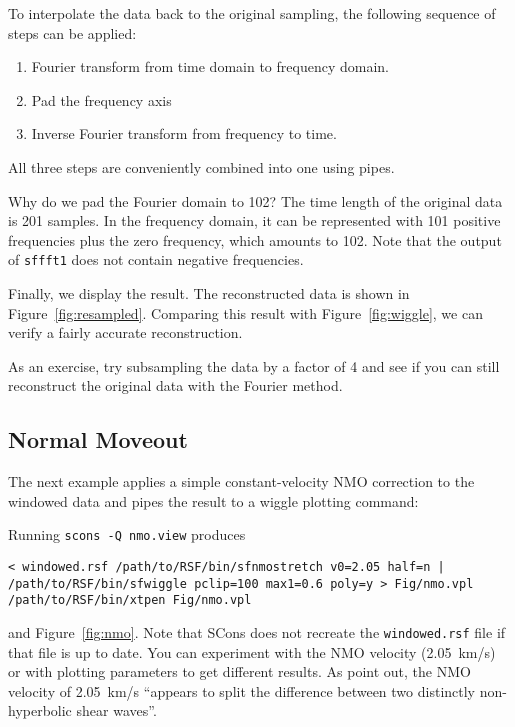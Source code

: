 To interpolate the data back to the original sampling, the following sequence
of steps can be applied:
\begin{enumerate}
\item Fourier transform from time domain to frequency domain.
\item Pad the frequency axis
\item Inverse Fourier transform from frequency to time.
\end{enumerate}
All three steps are conveniently combined into one using pipes.


Why do we pad the Fourier domain to 102? The time length of the original data
is 201 samples. In the frequency domain, it can be represented with 101
positive frequencies plus the zero frequency, which amounts to 102. Note that
the output of \texttt{sffft1} does not contain negative frequencies.

Finally, we display the result. The reconstructed data is shown in
Figure~\ref{fig:resampled}. Comparing this result with
Figure~\ref{fig:wiggle}, we can verify a fairly accurate reconstruction.



As an exercise, try subsampling the data by a factor of 4 and see if you can
still reconstruct the original data with the Fourier method.

\subsection{Normal Moveout}

The next example applies a simple constant-velocity NMO correction to the
windowed data
and pipes the result to a wiggle plotting command:


Running \texttt{scons -Q nmo.view} produces 
\begin{verbatim}
< windowed.rsf /path/to/RSF/bin/sfnmostretch v0=2.05 half=n | 
/path/to/RSF/bin/sfwiggle pclip=100 max1=0.6 poly=y > Fig/nmo.vpl
/path/to/RSF/bin/xtpen Fig/nmo.vpl
\end{verbatim}
and Figure~\ref{fig:nmo}. Note that SCons does not recreate the
\texttt{windowed.rsf} file if that file is up to date. You can
experiment with the NMO velocity (2.05~km/s) or with plotting
parameters to get different results. As \cite{Dellinger.sep.73.461}
point out, the NMO velocity of 2.05~km/s ``appears to split the
difference between two distinctly non-hyperbolic shear waves''.

